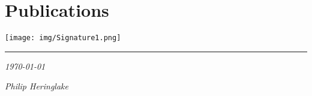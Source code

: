 \documentclass[10pt, print]{friggeri-cv}
\begin{document}
\section{Publications}
% 
%
\vspace{3cm}
\hfill \begin{minipage}[t]{.4\textwidth}
	\raggedleft
	\hspace{.5cm}\texttt{[image: img/Signature1.png]}
\end{minipage}
\vspace{0.3cm}
\hrule
\vspace{0.3cm}
\begin{minipage}[t]{.3\textwidth}
	\raggedright
	\emph{\today}
\end{minipage}
\hfill
\begin{minipage}[t]{.4\textwidth}
	\raggedleft
	\emph{Philip Heringlake}
\end{minipage}



\end{document}
